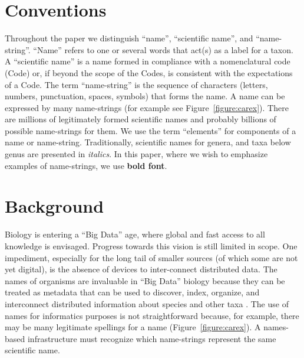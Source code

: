 \documentclass{bmcart}
\begin{document}
\section*{Conventions}

Throughout the paper we distinguish ``name'', ``scientific name'', and ``name-string''. ``Name'' refers to one or several words that act(s) as a label for a taxon. A ``scientific name'' is a name formed in compliance with a nomenclatural code (Code) or, if beyond the scope of the Codes, is consistent with the expectations of a Code. The term ``name-string'' is the sequence of characters (letters, numbers, punctuation, spaces, symbols) that forms the name. A name can be expressed by many name-strings (for example see Figure~\ref{figure:carex}). There are millions of legitimately formed scientific names and probably billions of possible name-strings for them. We use the term ``elements'' for  components of a name or name-string. Traditionally, scientific names for genera, and taxa below genus are presented in \textit{italics}. In this paper, where we wish to emphasize examples of name-strings, we use \textbf{bold font}.

\section*{Background}

Biology is entering a ``Big Data'' age, where global and fast access to all knowledge is envisaged. Progress towards this vision is still limited in scope. One impediment, especially for the long tail of smaller sources (of which some are not yet digital), is the absence of devices to inter-connect distributed data. The names of organisms are invaluable in ``Big Data'' biology because they can be treated as metadata that can be used to discover, index, organize, and interconnect distributed information about species and other taxa \cite{Patterson2010}. The use of names for informatics purposes is not straightforward because, for example, there may be many legitimate spellings for a name (Figure~\ref{figure:carex}). A names-based infrastructure must recognize which name-strings represent the same scientific name.
\end{document}
